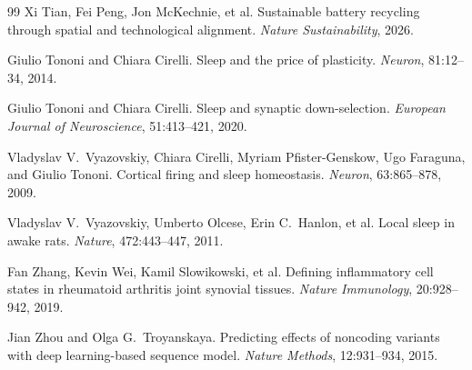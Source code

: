 \documentclass[12pt, a4paper]{article}
\theoremstyle{definition}
\begin{document}
\begin{thebibliography}{99}
Xi Tian, Fei Peng, Jon McKechnie, et al.
\newblock Sustainable battery recycling through spatial and technological alignment.
\newblock \textit{Nature Sustainability}, 2026.

Giulio Tononi and Chiara Cirelli.
\newblock Sleep and the price of plasticity.
\newblock \textit{Neuron}, 81:12--34, 2014.

Giulio Tononi and Chiara Cirelli.
\newblock Sleep and synaptic down-selection.
\newblock \textit{European Journal of Neuroscience}, 51:413--421, 2020.

Vladyslav V.\ Vyazovskiy, Chiara Cirelli, Myriam Pfister-Genskow, Ugo Faraguna, and Giulio Tononi.
\newblock Cortical firing and sleep homeostasis.
\newblock \textit{Neuron}, 63:865--878, 2009.

Vladyslav V.\ Vyazovskiy, Umberto Olcese, Erin C.\ Hanlon, et al.
\newblock Local sleep in awake rats.
\newblock \textit{Nature}, 472:443--447, 2011.

Fan Zhang, Kevin Wei, Kamil Slowikowski, et al.
\newblock Defining inflammatory cell states in rheumatoid arthritis joint synovial tissues.
\newblock \textit{Nature Immunology}, 20:928--942, 2019.

Jian Zhou and Olga G.\ Troyanskaya.
\newblock Predicting effects of noncoding variants with deep learning-based sequence model.
\newblock \textit{Nature Methods}, 12:931--934, 2015.

\end{thebibliography}
\end{document}
